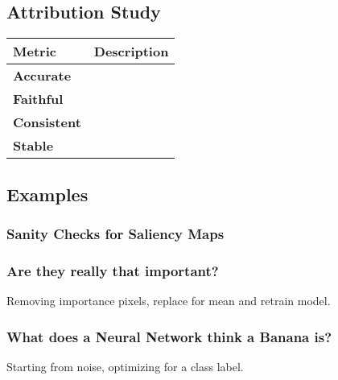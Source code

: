 \subsection{Attribution Study}
\begin{summary}
    \begin{center}
        \begin{tabular}{ll}
            \toprule
            \textbf{Metric} & \textbf{Description} \\
            \midrule
            \textbf{Accurate} & \\
            \midrule
            \textbf{Faithful} & \\
            \midrule
            \textbf{Consistent} & \\
            \midrule
            \textbf{Stable} & \\
        \end{tabular}
    \end{center}    
\end{summary}

\begin{summary}
\end{summary}
\newpage

\subsection{Examples}
\subsubsection{Sanity Checks for Saliency Maps}
\begin{example}
\end{example}
\newpage

\subsubsection{Are they really that important?}
\begin{example} Removing importance pixels, replace for mean and retrain model.
\end{example}

\subsubsection{What does a Neural Network think a Banana is?}
\begin{example}
    Starting from noise, optimizing for a class label.
\end{example}
\newpage

